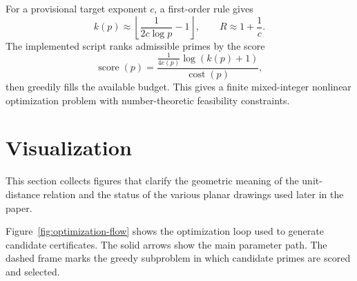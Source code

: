 \documentclass[a4paper,12pt]{article}
\begin{document}
For a provisional target exponent $c$, a first-order rule gives
\[
  k(p)\approx \left\lfloor \frac{1}{2c\log p}-1\right\rfloor,
  \qquad
  R\approx 1+\frac{1}{c}.
\]
The implemented script ranks admissible primes by the score
\[
  \operatorname{score}(p)=
  \frac{\frac{1}{4e(p)}\log(k(p)+1)}{\operatorname{cost}(p)},
\]
then greedily fills the available budget.  This gives a finite mixed-integer nonlinear optimization problem with number-theoretic feasibility constraints.

\section{Visualization}

This section collects figures that clarify the geometric meaning of the unit-distance relation and the status of the various planar drawings used later in the paper.

Figure~\ref{fig:optimization-flow} shows the optimization loop used to generate candidate certificates.  The solid arrows show the main parameter path.  The dashed frame marks the greedy subproblem in which candidate primes are scored and selected.
\end{document}

